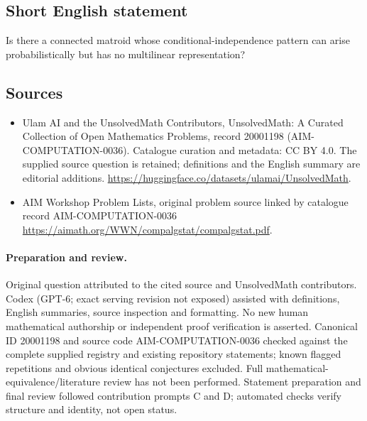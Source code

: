 \documentclass[11pt]{article}
\begin{document}
\subsection{Short English statement}
Is there a connected matroid whose conditional-independence pattern can arise probabilistically but has no multilinear representation?
\subsection{Sources}
\begin{itemize}
\item[\hypertarget{source:20001198:1}{S1}] Ulam AI and the UnsolvedMath Contributors, UnsolvedMath: A Curated Collection of Open Mathematics Problems, record 20001198 (AIM-COMPUTATION-0036). Catalogue curation and metadata: CC BY 4.0. The supplied source question is retained; definitions and the English summary are editorial additions.
\url{https://huggingface.co/datasets/ulamai/UnsolvedMath}.
\item[\hypertarget{source:20001198:2}{S2}] AIM Workshop Problem Lists, original problem source linked by catalogue record AIM-COMPUTATION-0036
\url{https://aimath.org/WWN/compalgstat/compalgstat.pdf}.
\end{itemize}
\paragraph{Preparation and review.}
Original question attributed to the cited source and UnsolvedMath contributors. Codex (GPT-6; exact serving revision not exposed) assisted with definitions, English summaries, source inspection and formatting. No new human mathematical authorship or independent proof verification is asserted. Canonical ID 20001198 and source code AIM-COMPUTATION-0036 checked against the complete supplied registry and existing repository statements; known flagged repetitions and obvious identical conjectures excluded. Full mathematical-equivalence/literature review has not been performed. Statement preparation and final review followed contribution prompts C and D; automated checks verify structure and identity, not open status.
\label{end:20001198}
\end{document}
